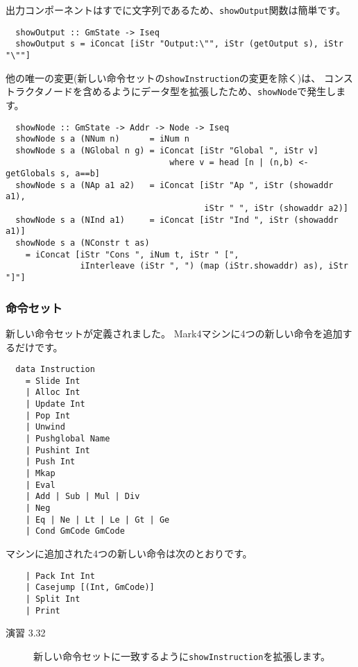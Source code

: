 \documentclass{jarticle}
\begin{document}
出力コンポーネントはすでに文字列であるため、\texttt{showOutput}関数は簡単です。

\begin{verbatim}
  showOutput :: GmState -> Iseq
  showOutput s = iConcat [iStr "Output:\"", iStr (getOutput s), iStr "\""]
\end{verbatim}

他の唯一の変更(新しい命令セットの\texttt{showInstruction}の変更を除く)は、
コンストラクタノードを含めるようにデータ型を拡張したため、\texttt{showNode}で発生します。

\begin{verbatim}
  showNode :: GmState -> Addr -> Node -> Iseq
  showNode s a (NNum n)      = iNum n
  showNode s a (NGlobal n g) = iConcat [iStr "Global ", iStr v]
                                 where v = head [n | (n,b) <- getGlobals s, a==b]
  showNode s a (NAp a1 a2)   = iConcat [iStr "Ap ", iStr (showaddr a1),
                                        iStr " ", iStr (showaddr a2)]
  showNode s a (NInd a1)     = iConcat [iStr "Ind ", iStr (showaddr a1)]
  showNode s a (NConstr t as)
    = iConcat [iStr "Cons ", iNum t, iStr " [",
               iInterleave (iStr ", ") (map (iStr.showaddr) as), iStr "]"]
\end{verbatim}

\subsubsection{命令セット}

新しい命令セットが定義されました。
Mark4マシンに4つの新しい命令を追加するだけです。

\begin{verbatim}
  data Instruction
    = Slide Int
    | Alloc Int
    | Update Int
    | Pop Int
    | Unwind
    | Pushglobal Name
    | Pushint Int
    | Push Int
    | Mkap
    | Eval
    | Add | Sub | Mul | Div
    | Neg
    | Eq | Ne | Lt | Le | Gt | Ge
    | Cond GmCode GmCode
\end{verbatim}

マシンに追加された4つの新しい命令は次のとおりです。

\begin{verbatim}
    | Pack Int Int
    | Casejump [(Int, GmCode)]
    | Split Int
    | Print
\end{verbatim}

\begin{description}
	\item[演習 3.32] 新しい命令セットに一致するように\texttt{showInstruction}を拡張します。
\end{description}
\end{document}

